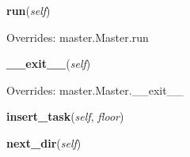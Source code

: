 \hspace{.8\funcindent}\begin{boxedminipage}{\funcwidth}

    \raggedright \textbf{run}(\textit{self})

\setlength{\parskip}{2ex}
\setlength{\parskip}{1ex}
      Overrides: master.Master.run

    \end{boxedminipage}

    \vspace{0.5ex}

\hspace{.8\funcindent}\begin{boxedminipage}{\funcwidth}

    \raggedright \textbf{\_\_exit\_\_}(\textit{self})

\setlength{\parskip}{2ex}
\setlength{\parskip}{1ex}
      Overrides: master.Master.\_\_exit\_\_

    \end{boxedminipage}

    \label{elev:Elev:insert_task}

    \vspace{0.5ex}

\hspace{.8\funcindent}\begin{boxedminipage}{\funcwidth}

    \raggedright \textbf{insert\_task}(\textit{self}, \textit{floor})

\setlength{\parskip}{2ex}
\setlength{\parskip}{1ex}
    \end{boxedminipage}

    \label{elev:Elev:next_dir}

    \vspace{0.5ex}

\hspace{.8\funcindent}\begin{boxedminipage}{\funcwidth}

    \raggedright \textbf{next\_dir}(\textit{self})

\setlength{\parskip}{2ex}
\setlength{\parskip}{1ex}
    \end{boxedminipage}

    \label{elev:Elev:movement_handler}

